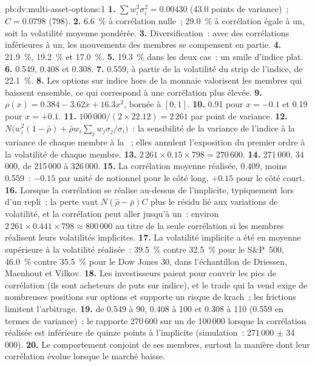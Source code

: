 \begin{solution}{pb:dv:multi-asset-options:1}
\textbf{1.} $\sum w_i^2\sigma_i^2=0.00430$ (43.0 points de variance)~; $C=0.0798$ (798).
\textbf{2.} 6.6~\% à corrélation nulle~; 29.0~\% à corrélation égale à un, soit la volatilité moyenne pondérée.
\textbf{3.} Diversification~: avec des corrélations inférieures à un, les mouvements des membres se compensent en partie.
\textbf{4.} 21.9~\%, 19.2~\% et 17.0~\%.
\textbf{5.} 19.3~\% dans les deux cas~: un smile d'indice plat.
\textbf{6.} 0.549, 0.408 et 0.308.
\textbf{7.} 0.559, à partir de la volatilité du strip de l'indice, de 22.1~\%.
\textbf{8.} Les options sur indice hors de la monnaie valorisent les membres qui baissent ensemble, ce qui correspond à une corrélation plus élevée.
\textbf{9.} $\rho(x)=0.384-3.62x+16.3x^2$, bornée à $[0,1]$.
\textbf{10.} 0.91 pour $x=-0.1$ et 0.19 pour $x=+0.1$.
\textbf{11.} $100\,000/(2\times22.12)=2\,261$ par point de variance.
\textbf{12.} $N\bigl(w_i^2(1-\bar\rho)+\bar\rho w_i\sum_jw_j\sigma_j/\sigma_i\bigr)$~: la sensibilité de la variance de l'indice à la variance de chaque membre
à la ~; elles annulent l'exposition du premier ordre à la volatilité de chaque membre.
\textbf{13.} $2\,261\times0.15\times798=270\,600$.
\textbf{14.} 271\,000, 34\,000, de 215\,000 à 326\,000.
\textbf{15.} La corrélation moyenne réalisée, 0.409, moins 0.559~: $-0.15$ par unité de notionnel pour le côté long, $+0.15$ pour le
côté court.
\textbf{16.} Lorsque la corrélation se réalise au-dessus de l'implicite, typiquement lors d'un repli~; la perte vaut $N(\hat\rho-\bar\rho)C$ plus le
résidu lié aux variations de volatilité, et la corrélation peut aller jusqu'à un~: environ $2\,261\times0.441\times798\approx800\,000$ au titre de la seule corrélation
si les membres réalisent leurs volatilités implicites.
\textbf{17.} La volatilité implicite a été en moyenne supérieure à la volatilité réalisée~: 39.5~\% contre 32.5~\% pour le S\&P~500, 46.0~\% contre 35.5~\% pour le Dow Jones 30,
dans l'échantillon de Driessen, Maenhout et Vilkov.
\textbf{18.} Les investisseurs paient pour couvrir les pics de corrélation (ils sont acheteurs de puts sur indice), et le trade qui la vend exige de nombreuses
positions sur options et supporte un risque de krach~; les frictions limitent l'arbitrage.
\textbf{19.}  de 0.549 à 90, 0.408 à 100 et 0.308 à 110 (0.559 en termes de variance)~; le  rapporte
270\,600 sur un  de 100\,000 lorsque la corrélation réalisée est inférieure de quinze points à l'implicite (simulation~: 271\,000 $\pm$ 34\,000).
\textbf{20.} Le comportement conjoint de ses membres, surtout la manière dont leur corrélation évolue lorsque le marché baisse.
\end{solution}

